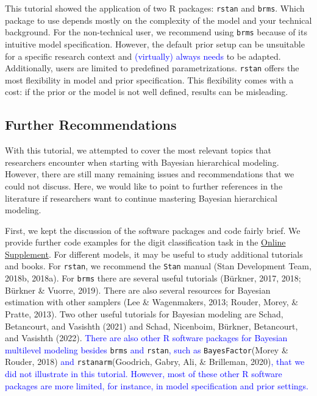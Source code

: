 \documentclass[
  english,
  doc,floatsintext]{apa6}
\begin{document}
This tutorial showed the application of two R packages: \texttt{rstan} and \texttt{brms}. Which package to use depends mostly on the complexity of the model and your technical background. For the non-technical user, we recommend using \texttt{brms} because of its intuitive model specification. However, the default prior setup can be unsuitable for a specific research context and \textcolor{blue}{(virtually) always needs} to be adapted. Additionally, users are limited to predefined parametrizations. \texttt{rstan} offers the most flexibility in model and prior specification. This flexibility comes with a cost: if the prior or the model is not well defined, results can be misleading.

\hypertarget{further-recommendations}{%
\subsection{Further Recommendations}\label{further-recommendations}}

With this tutorial, we attempted to cover the most relevant topics that researchers encounter when starting with Bayesian hierarchical modeling. However, there are still many remaining issues and recommendations that we could not discuss. Here, we would like to point to further references in the literature if researchers want to continue mastering Bayesian hierarchical modeling.

First, we kept the discussion of the software packages and code fairly brief. We provide further code examples for the digit classification task in the \href{https://github.com/MyrtheV/Bayesian-Hierarchical-Modelling-An-Introduction-and-Reassessment}{Online Supplement}. For different models, it may be useful to study additional tutorials and books. For \texttt{rstan}, we recommend the \texttt{Stan} manual (Stan Development Team, 2018b, 2018a). For \texttt{brms} there are several useful tutorials (Bürkner, 2017, 2018; Bürkner \& Vuorre, 2019). There are also several resources for Bayesian estimation with other samplers (Lee \& Wagenmakers, 2013; Rouder, Morey, \& Pratte, 2013). Two other useful tutorials for Bayesian modeling are Schad, Betancourt, and
Vasishth (2021) and Schad, Nicenboim, Bürkner, Betancourt, and Vasishth (2022). \textcolor{blue}{There are also other R software packages for Bayesian multilevel modeling besides} \texttt{brms} \textcolor{blue}{and} \texttt{rstan}\textcolor{blue}{, such as} \texttt{BayesFactor}(Morey \& Rouder, 2018) \textcolor{blue}{and} \texttt{rstanarm}(Goodrich, Gabry, Ali, \& Brilleman, 2020)\textcolor{blue}{, that we did not illustrate in this tutorial. However, most of these other R software packages are more limited, for instance, in model specification and prior settings.}
\end{document}
